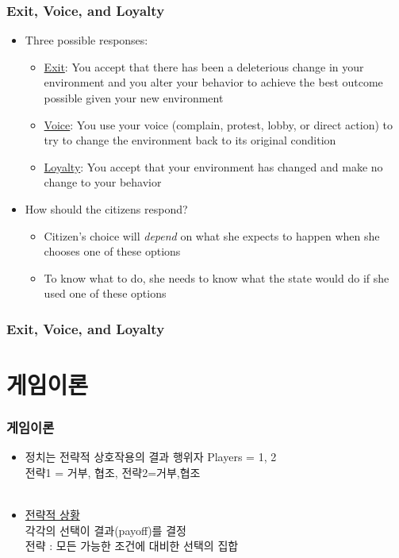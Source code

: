 \documentclass[xcolor=pdftex,dvipsnames]{beamer}
\begin{document}
\begin{frame}
\frametitle{Exit, Voice, and Loyalty}
\begin{itemize}
\item Three possible responses:
\begin{itemize}
\item \underline{Exit}: You accept that there has been a deleterious change in your environment and you alter your behavior to achieve the best outcome possible given your new environment
\item \underline{Voice}: You use your voice (complain, protest, lobby, or direct action) to try to change the environment back to its original condition
\item \underline{Loyalty}: You accept that your environment has changed and make no change to your behavior
\end{itemize}
\item How should the citizens respond?
\begin{itemize}
\item Citizen's choice will \emph{depend} on what she expects to happen when she chooses one of these options
\item To know what to do, she needs to know what the state would do if she used one of these options
\end{itemize}
\end{itemize}
\end{frame}

\begin{frame}
\frametitle{Exit, Voice, and Loyalty}
\end{frame}


\section{게임이론}

\begin{frame}
\frametitle{게임이론}
\begin{itemize}
\item 정치는 전략적 상호작용의 결과
행위자 Players = {1, 2} \\
전략1 = {거부, 협조}, 전략2={거부,협조}\\

\

\item \underline{전략적 상황}\\
각각의 선택이 결과(payoff)를 결정\\
전략 : 모든 가능한 조건에 대비한 선택의 집합 \\

\end{itemize}
\end{frame}
\end{document}
